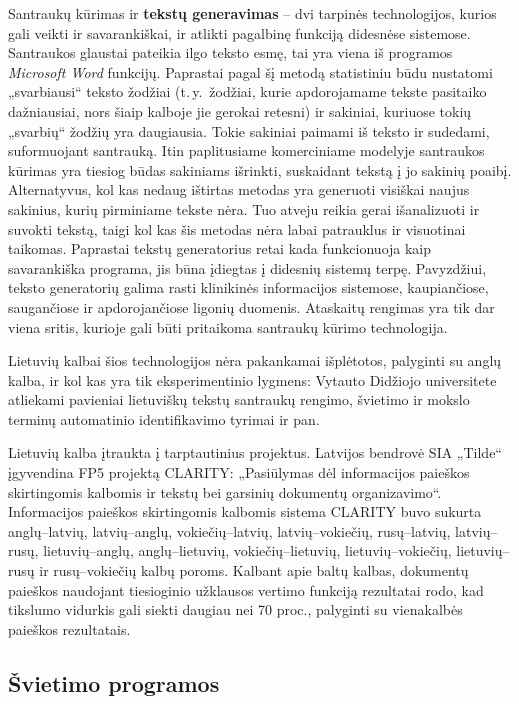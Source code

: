 \begin{multicols}{2}
   Santraukų kūrimas ir  \textbf{tekstų generavimas} – dvi tarpinės technologijos, kurios gali veikti ir savarankiškai, ir atlikti pagalbinę funkciją didesnėse sistemose. Santraukos glaustai pateikia ilgo teksto esmę, tai yra viena iš programos \textit{Microsoft Word} funkcijų. Paprastai pagal šį metodą statistiniu būdu nustatomi „svarbiausi“ teksto žodžiai (t.\,y.~žodžiai, kurie apdorojamame tekste pasitaiko dažniausiai, nors šiaip kalboje jie gerokai retesni) ir sakiniai, kuriuose tokių „svarbių“ žodžių yra daugiausia. Tokie sakiniai paimami iš teksto ir sudedami, suformuojant santrauką. Itin paplitusiame komerciniame modelyje santraukos kūrimas yra tiesiog būdas sakiniams išrinkti, suskaidant tekstą į jo sakinių poaibį. Alternatyvus, kol kas nedaug ištirtas metodas yra generuoti visiškai naujus sakinius, kurių pirminiame tekste nėra. Tuo atveju reikia gerai išanalizuoti ir suvokti tekstą, taigi kol kas šis metodas nėra labai patrauklus ir visuotinai taikomas. Paprastai tekstų generatorius retai kada funkcionuoja kaip savarankiška programa, jis būna įdiegtas į didesnių sistemų terpę. Pavyzdžiui, teksto generatorių galima rasti klinikinės informacijos sistemose, kaupiančiose, saugančiose ir apdorojančiose ligonių duomenis. Ataskaitų rengimas yra tik dar viena sritis, kurioje gali būti pritaikoma santraukų kūrimo technologija.   

    Lietuvių kalbai šios technologijos nėra pakankamai išplėtotos, palyginti su anglų kalba, ir kol kas yra tik eksperimentinio lygmens: Vytauto Didžiojo universitete atliekami pavieniai lietuviškų tekstų santraukų rengimo, švietimo ir mokslo terminų automatinio identifikavimo tyrimai ir pan.    

   Lietuvių kalba įtraukta į tarptautinius projektus. Latvijos bendrovė SIA „Tilde“ įgyvendina  FP5 projektą CLARITY: „Pasiūlymas dėl informacijos paieškos skirtingomis kalbomis ir tekstų bei garsinių dokumentų organizavimo“. Informacijos paieškos skirtingomis kalbomis sistema CLARITY buvo sukurta anglų–latvių, latvių–anglų, vokiečių–latvių, latvių–vokiečių, rusų–latvių, latvių–rusų, lietuvių–anglų, anglų–lietuvių, vokiečių–lietuvių, lietuvių–vokiečių, lietuvių–rusų ir rusų–vokiečių kalbų poroms. Kalbant apie baltų kalbas, dokumentų paieškos naudojant tiesioginio užklausos vertimo funkciją rezultatai rodo, kad tikslumo vidurkis gali siekti daugiau nei 70 proc., palyginti su vienakalbės paieškos rezultatais.

\subsection{Švietimo programos}


\end{multicols}
